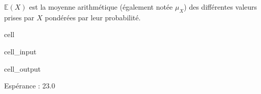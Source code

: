 \documentclass[letterpaper,10pt,french]{sphinxmanual}
\begin{document}
\sphinxAtStartPar
\(\mathbb E(X)\) est la moyenne arithmétique (également notée \(\mu_X\)) des différentes valeurs prises par \(X\) pondérées par leur probabilité.

\begin{sphinxuseclass}{cell}
\begin{sphinxuseclass}{cell_input}
\begin{sphinxVerbatim}[commandchars=\\\{\}]
   
  \PYG{p}{[}  \PYG{p}{]}
  \PYG{p}{[}  \PYG{p}{]}
   
 
\end{sphinxVerbatim}

\end{sphinxuseclass}
\begin{sphinxuseclass}{cell_output}
\begin{sphinxVerbatim}[commandchars=\\\{\}]
Espérance :  23.0
\end{sphinxVerbatim}

\end{sphinxuseclass}
\end{sphinxuseclass}
\end{document}
